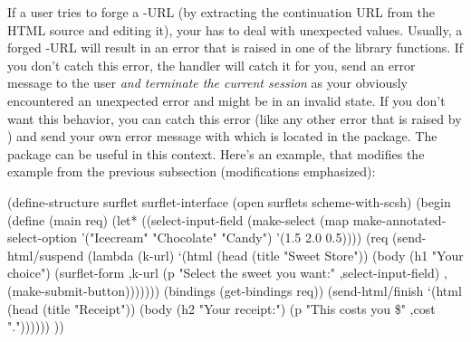 If a user tries to forge a \surflet-URL (\eg by extracting the
continuation URL from the HTML source and editing it), your \surflet
has to deal with unexpected values.  Usually, a forged \surflet-URL
will result in an error that is raised in one of the \surflet library
functions.  If you don't catch this error, the \surflet handler will
catch it for you, send an error message to the user
\emph{and terminate the current session} as your \surflet obviously
encountered an unexpected error and might be in an invalid state.  If
you don't want this behavior, you can catch this error (like any other
error that is raised by \scsh) and send your own error message with
 which is located in the 
package.  The  package can be useful in this
context.  Here's an example, that modifies the example from the
previous subsection (modifications emphasized):

\begin{listing}
(define-structure surflet surflet-interface
  (open surflets
        scheme-with-scsh)
  (begin
    (define (main req)
      (let* ((select-input-field 
              (make-select
               (map make-annotated-select-option
                    '("Icecream" "Chocolate" "Candy")
                    '(1.5 2.0 0.5))))
              (req (send-html/suspend
                    (lambda (k-url)
                      `(html 
                        (head (title "Sweet Store"))
                        (body
                         (h1 "Your choice")
                         (surflet-form 
                          ,k-url
                          (p "Select the sweet you want:"
                             ,select-input-field)
                          ,(make-submit-button)))))))
              (bindings (get-bindings req))
        (send-html/finish
         `(html (head (title "Receipt"))
                (body
                 (h2 "Your receipt:")
                 (p "This costs you \$" ,cost "."))))))
))
\end{listing}

